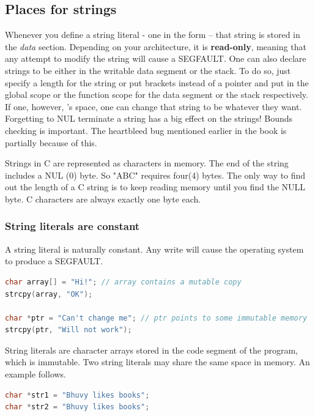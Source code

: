 \subsection{Places for strings}

Whenever you define a string literal - one in the form  -- that string is stored in the \emph{data} section. Depending on your architecture, it is \textbf{read-only}, meaning that any attempt to modify the string will cause a SEGFAULT.
One can also declare strings to be either in the writable data segment or the stack. To do so, just specify a length for the string or put brackets instead of a pointer  and put in the global scope or the function scope for the data segment or the stack respectively.
If one, however, 's space, one can change that string to be whatever they want.
Forgetting to NUL terminate a string has a big effect on the strings! Bounds checking is important.
The heartbleed bug mentioned earlier in the book is partially because of this.

Strings in C are represented as characters in memory.
The end of the string includes a NUL (0) byte.
So "ABC" requires four(4) bytes.
The only way to find out the length of a C string is to keep reading memory until you find the NULL byte.
C characters are always exactly one byte each.

\subsubsection{String literals are constant}

A string literal is naturally constant.
Any write will cause the operating system to produce a SEGFAULT. 

\begin{lstlisting}[language=C]
char array[] = "Hi!"; // array contains a mutable copy
strcpy(array, "OK");

char *ptr = "Can't change me"; // ptr points to some immutable memory
strcpy(ptr, "Will not work");
\end{lstlisting}

String literals are character arrays stored in the code segment of the program, which is immutable.
Two string literals may share the same space in memory.
An example follows.

\begin{lstlisting}[language=C]
char *str1 = "Bhuvy likes books";
char *str2 = "Bhuvy likes books";
\end{lstlisting}

